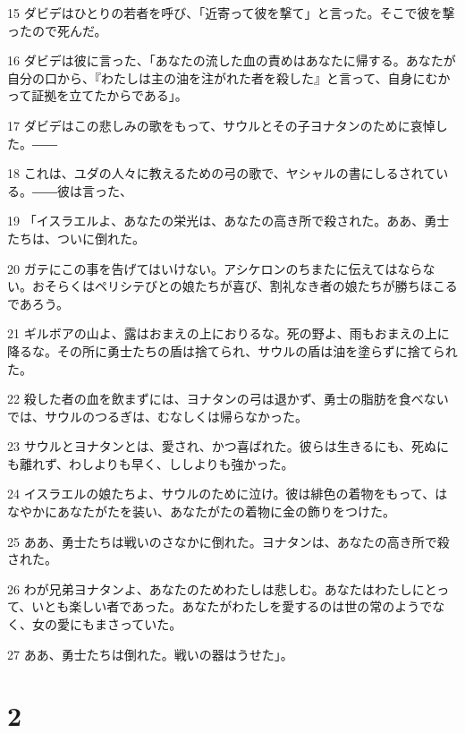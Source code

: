 \par 15 ダビデはひとりの若者を呼び、「近寄って彼を撃て」と言った。そこで彼を撃ったので死んだ。
\par 16 ダビデは彼に言った、「あなたの流した血の責めはあなたに帰する。あなたが自分の口から、『わたしは主の油を注がれた者を殺した』と言って、自身にむかって証拠を立てたからである」。
\par 17 ダビデはこの悲しみの歌をもって、サウルとその子ヨナタンのために哀悼した。――
\par 18 これは、ユダの人々に教えるための弓の歌で、ヤシャルの書にしるされている。――彼は言った、
\par 19 「イスラエルよ、あなたの栄光は、あなたの高き所で殺された。ああ、勇士たちは、ついに倒れた。
\par 20 ガテにこの事を告げてはいけない。アシケロンのちまたに伝えてはならない。おそらくはペリシテびとの娘たちが喜び、割礼なき者の娘たちが勝ちほこるであろう。
\par 21 ギルボアの山よ、露はおまえの上におりるな。死の野よ、雨もおまえの上に降るな。その所に勇士たちの盾は捨てられ、サウルの盾は油を塗らずに捨てられた。
\par 22 殺した者の血を飲まずには、ヨナタンの弓は退かず、勇士の脂肪を食べないでは、サウルのつるぎは、むなしくは帰らなかった。
\par 23 サウルとヨナタンとは、愛され、かつ喜ばれた。彼らは生きるにも、死ぬにも離れず、わしよりも早く、ししよりも強かった。
\par 24 イスラエルの娘たちよ、サウルのために泣け。彼は緋色の着物をもって、はなやかにあなたがたを装い、あなたがたの着物に金の飾りをつけた。
\par 25 ああ、勇士たちは戦いのさなかに倒れた。ヨナタンは、あなたの高き所で殺された。
\par 26 わが兄弟ヨナタンよ、あなたのためわたしは悲しむ。あなたはわたしにとって、いとも楽しい者であった。あなたがわたしを愛するのは世の常のようでなく、女の愛にもまさっていた。
\par 27 ああ、勇士たちは倒れた。戦いの器はうせた」。

\chapter{2}

